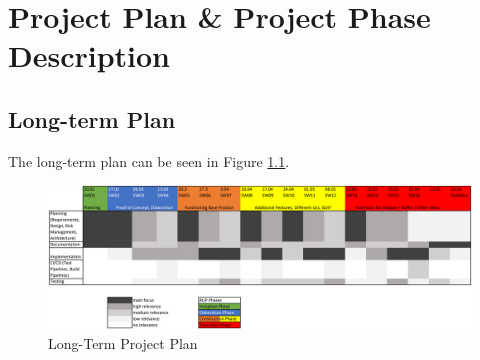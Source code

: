 \chapter{Project Plan \& Project Phase Description}

\section{Long-term Plan}

The long-term plan can be seen in Figure \ref*{fig:longTermPlan}.

\begin{figure}[!ht]
    \centering
    \includegraphics[width=0.96\textheight,angle=270]{resources/LongTermPlan.PNG}
    \caption{Long-Term Project Plan}
    \label{fig:longTermPlan}
\end{figure}
